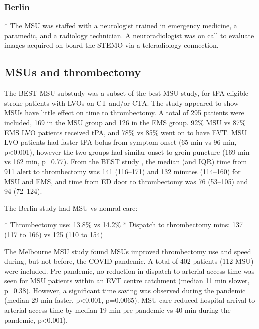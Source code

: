 \subsubsection{Berlin \cite{ebinger_effects_2015}}

* The MSU was staffed with a neurologist trained in emergency medicine, a
paramedic, and a radiology technician. A neuroradiologist was on call to evaluate images acquired on board the STEMO via a teleradiology connection.




\subsection{MSUs and thrombectomy}

The BEST-MSU substudy \cite{czap_abstract_2022} was a subset of the best MSU study, for tPA-eligible stroke patients with LVOs on CT and/or CTA. The study appeared to show MSUs have little effect on time to thrombectomy. A total of 295 patients were included, 169 in the MSU group and 126 in the EMS group. 92\% MSU vs 87\% EMS LVO patients received tPA, and 78\% vs 85\% went on to have EVT. MSU LVO patients had faster tPA bolus from symptom onset (65 min vs 96 min, p<0.001), however the two groups had similar onset to groin puncture (169 min vs 162 min, p=0.77). From the BEST study \cite{grotta_prospective_2021}, the median (and IQR) time from 911 alert to  thrombectomy was 141 (116–171) and 132 minutes (114–160) for MSU and EMS, and  time from ED door to thrombectomy was 76 (53–105) and 94 (72–124).

The Berlin study \cite{ebinger_association_2021} had MSU vs nomral care:

* Thrombectomy use: 13.8\% vs 14.2\%
* Dispatch to thrombectomy mins: 137 (117 to 166) vs 125 (110 to 154)


The Melbourne MSU study \cite{menezes_abstract_2023} found MSUs improved thrombectomy use and speed during, but not before, the COVID pandemic. A total of 402 patients (112 MSU) were included. Pre-pandemic, no reduction in dispatch to arterial access time was seen for MSU patients within an EVT centre catchment (median 11 min slower, p=0.38). However, a significant time saving was observed during the pandemic (median 29 min faster, p<0.001, p=0.0065). MSU care reduced hospital arrival to arterial access time by median 19 min pre-pandemic vs 40 min during the pandemic, p<0.001).

